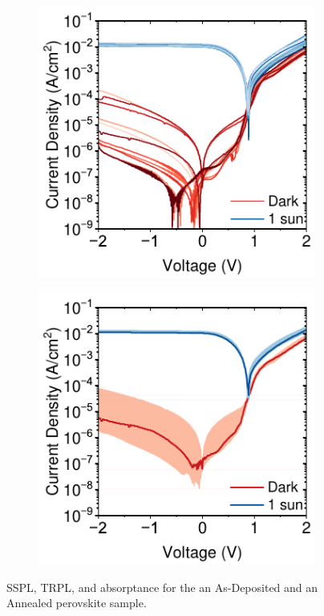 \begin{figure}[htbp]
    \begin{subfigure}[t]{0.45\textwidth}
        \centering
        \includegraphics[width=\textwidth]{chapters/material_properties/images/low_yield_discrete.pdf} %
        \caption{}
        \label{fig:ch2:low_yield_discrete}
    \end{subfigure}
    \hfill
    \begin{subfigure}[t]{0.45\textwidth}
        \centering
        \includegraphics[width=\textwidth]{chapters/material_properties/images/low_yield_median.pdf} %
        \caption{}
        \label{fig:ch2:low_yield_median}
    \end{subfigure}
    \caption{SSPL, TRPL, and absorptance for the an As-Deposited and an Annealed perovskite sample.}
\end{figure}




